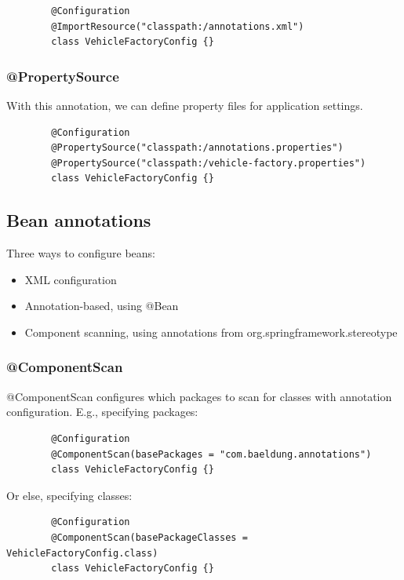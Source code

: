 \documentclass{scrartcl}
\begin{document}
    \begin{lstlisting}
        @Configuration
        @ImportResource("classpath:/annotations.xml")
        class VehicleFactoryConfig {}
    \end{lstlisting}

\subsubsection{@PropertySource}

    With this annotation, we can define property files for application settings.

    \begin{lstlisting}
        @Configuration
        @PropertySource("classpath:/annotations.properties")
        @PropertySource("classpath:/vehicle-factory.properties")
        class VehicleFactoryConfig {}
    \end{lstlisting}

\subsection{Bean annotations}

    Three ways to configure beans:

    \begin{itemize}
        \item XML configuration
        \item Annotation-based, using @Bean
        \item Component scanning, using annotations from org.springframework.stereotype
    \end{itemize}

\subsubsection{@ComponentScan}

    @ComponentScan configures which packages to scan for classes with annotation configuration. E.g., specifying packages:

    \begin{lstlisting}
        @Configuration
        @ComponentScan(basePackages = "com.baeldung.annotations")
        class VehicleFactoryConfig {}
    \end{lstlisting}

    Or else, specifying classes:

    \begin{lstlisting}
        @Configuration
        @ComponentScan(basePackageClasses = VehicleFactoryConfig.class)
        class VehicleFactoryConfig {}
    \end{lstlisting}
\end{document}
